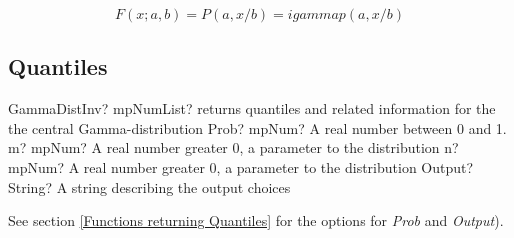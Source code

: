 \vspace{0.3cm}
\begin{equation} 
	F(x; a, b)= P(a,x/b) = igammap(a,x/b)
\end{equation}

\subsection{Quantiles}

\begin{mpFunctionsExtract}
	\mpFunctionThree
	{GammaDistInv? mpNumList? returns quantiles and related information for the the central Gamma-distribution}
	{Prob? mpNum? A real number between 0 and 1.}
	{m? mpNum? A real number greater 0, a parameter to the distribution}
	{n? mpNum? A real number greater 0, a parameter to the distribution}
	{Output? String? A string describing the output choices}
\end{mpFunctionsExtract}

See section \ref{Functions returning Quantiles} for the options for  {\itshape\sffamily Prob} and {\itshape\sffamily Output}). 

%
%
%




